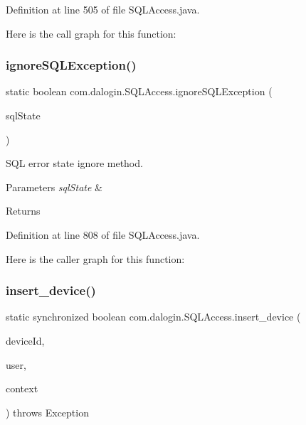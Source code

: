 Definition at line 505 of file S\+Q\+L\+Access.\+java.

Here is the call graph for this function\+:
\mbox{\label{classcom_1_1dalogin_1_1_s_q_l_access_a294bf0428542df2a5015774d5b3a8585}} 
\subsubsection{\texorpdfstring{ignore\+S\+Q\+L\+Exception()}{ignoreSQLException()}}
{\footnotesize\ttfamily static boolean com.\+dalogin.\+S\+Q\+L\+Access.\+ignore\+S\+Q\+L\+Exception (\begin{DoxyParamCaption}\item[{String}]{sql\+State }\end{DoxyParamCaption})\hspace{0.3cm}{\ttfamily [static]}}

S\+QL error state ignore method.


\begin{DoxyParams}{Parameters}
{\em sql\+State} & \\
\hline
\end{DoxyParams}
\begin{DoxyReturn}{Returns}

\end{DoxyReturn}


Definition at line 808 of file S\+Q\+L\+Access.\+java.

Here is the caller graph for this function\+:
\mbox{\label{classcom_1_1dalogin_1_1_s_q_l_access_a45cc8de9b6d3bfbd1ad9142c285fd6c4}} 
\subsubsection{\texorpdfstring{insert\+\_\+device()}{insert\_device()}}
{\footnotesize\ttfamily static synchronized boolean com.\+dalogin.\+S\+Q\+L\+Access.\+insert\+\_\+device (\begin{DoxyParamCaption}\item[{String}]{device\+Id,  }\item[{String}]{user,  }\item[{Servlet\+Context}]{context }\end{DoxyParamCaption}) throws Exception\hspace{0.3cm}{\ttfamily [static]}}

